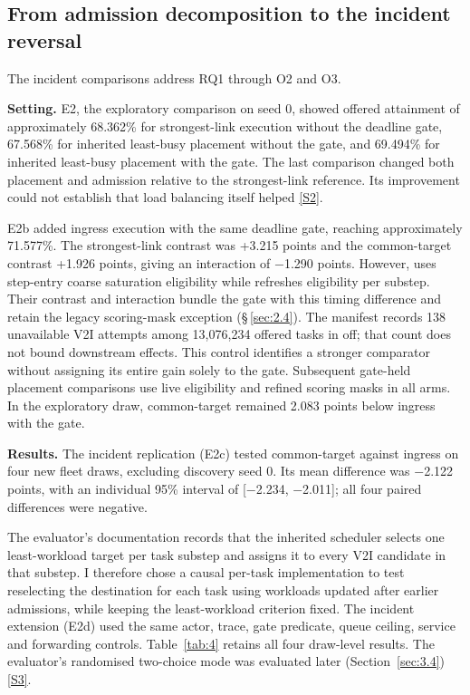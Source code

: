 \documentclass[12pt,a4paper]{article}
\begin{document}

\FloatBarrier
\subsection{From admission decomposition to the incident reversal}\label{sec:3.2}

The incident comparisons address RQ1 through O2 and O3.

\textbf{Setting.} E2, the exploratory comparison on seed 0, showed offered attainment of approximately 68.362\% for strongest-link execution without the deadline gate, 67.568\% for inherited least-busy placement without the gate, and 69.494\% for inherited least-busy placement with the gate. The last comparison changed both placement and admission relative to the strongest-link reference. Its improvement could not establish that load balancing itself helped \hyperref[source-s2]{[S2]}.

E2b added ingress execution with the same deadline gate, reaching approximately 71.577\%. The strongest-link contrast was +3.215 points and the common-target contrast +1.926 points, giving an interaction of \ensuremath{-}1.290 points. However,  uses step-entry coarse saturation eligibility while  refreshes eligibility per substep. Their contrast and interaction bundle the gate with this timing difference and retain the legacy scoring-mask exception (\S\,\ref{sec:2.4}). The manifest records 138 unavailable V2I attempts among 13,076,234 offered tasks in off; that count does not bound downstream effects. This control identifies a stronger comparator without assigning its entire gain solely to the gate. Subsequent gate-held placement comparisons use live eligibility and refined scoring masks in all arms. In the exploratory draw, common-target remained 2.083 points below ingress with the gate.

\textbf{Results.} The incident replication (E2c) tested common-target against ingress on four new fleet draws, excluding discovery seed 0. Its mean difference was \ensuremath{-}2.122 points, with an individual 95\% interval of [\ensuremath{-}2.234, \ensuremath{-}2.011]; all four paired differences were negative.

The evaluator's documentation records that the inherited scheduler selects one least-workload target per task substep and assigns it to every V2I candidate in that substep. I therefore chose a causal per-task implementation to test reselecting the destination for each task using workloads updated after earlier admissions, while keeping the least-workload criterion fixed. The incident extension (E2d) used the same actor, trace, gate predicate, queue ceiling, service and forwarding controls. Table~\ref{tab:4} retains all four draw-level results. The evaluator's randomised two-choice mode was evaluated later (Section~\ref{sec:3.4}) \hyperref[source-s3]{[S3]}.
\end{document}
